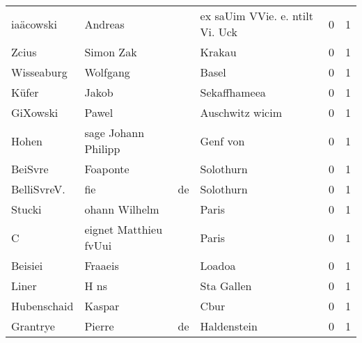 \begin{tabular}{llllrr}
                iaäcowski &                            Andreas &             &             ex saUim VVie. e. ntilt Vi. Uck &          0 &         1 \\
                    Zcius &                          Simon Zak &             &                                      Krakau &          0 &         1 \\
               Wisseaburg &                           Wolfgang &             &                                       Basel &          0 &         1 \\
                    Küfer &                              Jakob &             &                                Sekaffhameea &          0 &         1 \\
                 GiXowski &                              Pawel &             &                             Auschwitz wicim &          0 &         1 \\
                    Hohen &                sage Johann Philipp &             &                                    Genf von &          0 &         1 \\
                  BeiSvre &                           Foaponte &             &                                   Solothurn &          0 &         1 \\
              BelliSvreV. &                                fie &          de &                                   Solothurn &          0 &         1 \\
                   Stucki &                      ohann Wilhelm &             &                                       Paris &          0 &         1 \\
                        C &              eignet Matthieu fvUui &             &                                       Paris &          0 &         1 \\
                  Beisiei &                            Fraaeis &             &                                      Loadoa &          0 &         1 \\
                    Liner &                               H ns &             &                                  Sta Gallen &          0 &         1 \\
              Hubenschaid &                             Kaspar &             &                                        Cbur &          0 &         1 \\
                 Grantrye &                             Pierre &          de &                                 Haldenstein &          0 &         1 \\

\end{tabular}

